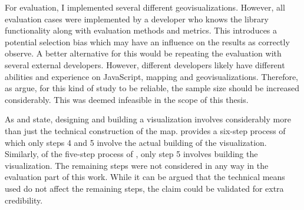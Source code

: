 For evaluation, I implemented several different geovisualizations. However, all evaluation cases were implemented by a developer who knows the library functionality along with evaluation methods and metrics. This introduces a potential selection bias which may have an influence on the results as \citet{kitchenham_evaluating_1998} correctly observe. A better alternative for this would be repeating the evaluation with several external developers. However, different developers likely have different abilities and experience on JavaScript, mapping and geovisualizations. Therefore, as \citet{mohagheghi_quality_2007} argue, for this kind of study to be reliable, the sample size should be increased considerably. This was deemed infeasible in the scope of this thesis.

As \citet{schlichtmann_visualization_2002} and \citet{slocum_thematic_2014} state, designing and building a visualization involves considerably more than just the technical construction of the map. \citeauthor{schlichtmann_visualization_2002} provides a six-step process of which only steps 4 and 5 involve the actual building of the visualization. Similarly, of the five-step process of \citeauthor{slocum_thematic_2014}, only step 5 involves building the visualization. The remaining steps were not considered in any way in the evaluation part of this work. While it can be argued that the technical means used do not affect the remaining steps, the claim could be validated for extra credibility.

